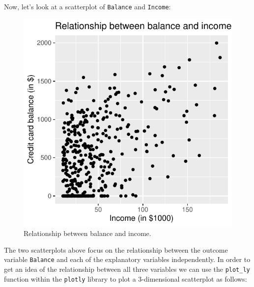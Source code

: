 \documentclass[
  letterpaper,
  DIV=11,
  numbers=noendperiod]{scrartcl}
\newenvironment{Shaded}{\begin{snugshade}}{\end{snugshade}}
\newcommand{\AttributeTok}[1]{\textcolor[rgb]{0.40,0.45,0.13}{#1}}
\newcommand{\FunctionTok}[1]{\textcolor[rgb]{0.28,0.35,0.67}{#1}}
\newcommand{\NormalTok}[1]{\textcolor[rgb]{0.00,0.23,0.31}{#1}}
\newcommand{\SpecialCharTok}[1]{\textcolor[rgb]{0.37,0.37,0.37}{#1}}
\newcommand{\StringTok}[1]{\textcolor[rgb]{0.13,0.47,0.30}{#1}}
\begin{document}
Now, let's look at a scatterplot of \texttt{Balance} and
\texttt{Income}:

\begin{Shaded}
\end{Shaded}

\begin{figure}[H]

{\centering \includegraphics{index_files/figure-pdf/unnamed-chunk-28-1.pdf}

}

\caption{Relationship between balance and income.}

\end{figure}%

The two scatterplots above focus on the relationship between the outcome
variable \texttt{Balance} and each of the explanatory variables
independently. In order to get an idea of the relationship between all
three variables we can use the \texttt{plot\_ly} function within the
\texttt{plotly} library to plot a 3-dimensional scatterplot as follows:
\end{document}
